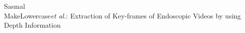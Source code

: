 \documentclass[journal]{IEEEtran}
\begin{document}
%
{Sasmal  \\MakeLowercase{\textit{et al.}}: Extraction of Key-frames of Endoscopic Videos by using Depth Information}
% 











\maketitle
\end{document}
